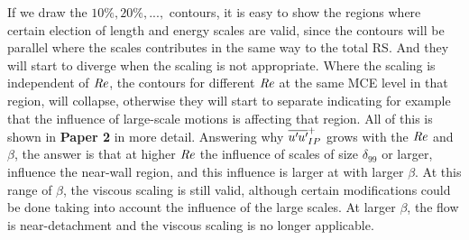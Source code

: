 If we draw the $10\%, 20\%,...,$ contours, it is easy to show the regions where certain election of length and energy scales are valid, since the contours will be parallel where the scales contributes in the same way to the total RS. And they will start to diverge when the scaling is not appropriate.
Where the scaling is independent of $\mbox{\textit{Re}}$, the contours for different $\mbox{\textit{Re}}$ at the same MCE level in that region, will collapse, otherwise they will start to separate indicating for example that the influence of large-scale motions is affecting that region.
All of this is shown in \textbf{Paper 2} in more detail.
Answering why $\overline{u^{\prime}\mkern-1.2mu u^{\prime}\mkern-1.2mu}_{IP}^+$ grows with the $\mbox{\textit{Re}}$ and $\beta$, the answer is that at higher $\mbox{\textit{Re}}$ the influence of scales of size $\delta_{99}$ or larger, influence the near-wall region, and this influence is larger at with larger $\beta$. At this range of $\beta$, the viscous scaling is still valid, although certain modifications could be done taking into account the influence of the large scales.
At larger $\beta$, the flow is near-detachment and the viscous scaling is no longer applicable.










